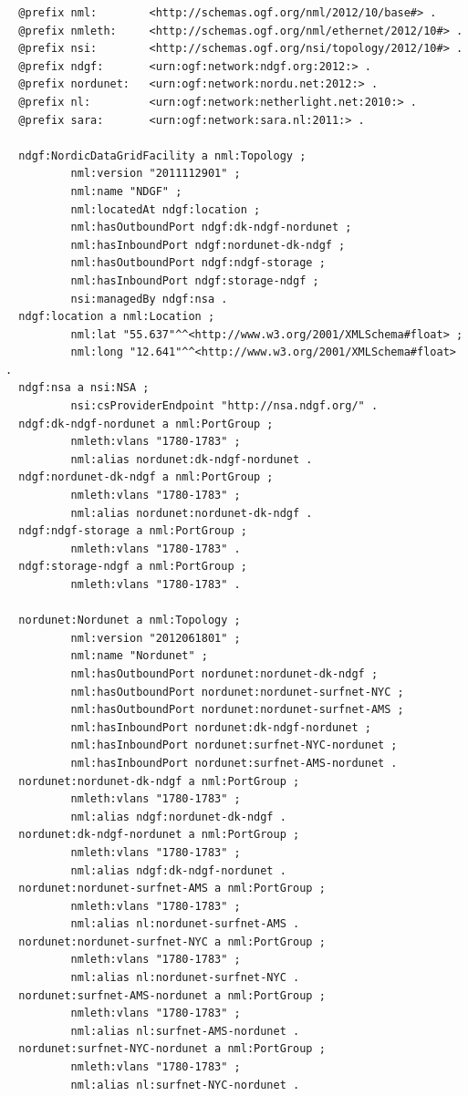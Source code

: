 \documentclass[12pt]{article}  %
\begin{document}
\begin{verbatim}
  @prefix nml:        <http://schemas.ogf.org/nml/2012/10/base#> .
  @prefix nmleth:     <http://schemas.ogf.org/nml/ethernet/2012/10#> .
  @prefix nsi:        <http://schemas.ogf.org/nsi/topology/2012/10#> .
  @prefix ndgf:       <urn:ogf:network:ndgf.org:2012:> .
  @prefix nordunet:   <urn:ogf:network:nordu.net:2012:> .
  @prefix nl:         <urn:ogf:network:netherlight.net:2010:> .
  @prefix sara:       <urn:ogf:network:sara.nl:2011:> .

  ndgf:NordicDataGridFacility a nml:Topology ;
          nml:version "2011112901" ;
          nml:name "NDGF" ;
          nml:locatedAt ndgf:location ;
          nml:hasOutboundPort ndgf:dk-ndgf-nordunet ;
          nml:hasInboundPort ndgf:nordunet-dk-ndgf ;
          nml:hasOutboundPort ndgf:ndgf-storage ;
          nml:hasInboundPort ndgf:storage-ndgf ;
          nsi:managedBy ndgf:nsa .
  ndgf:location a nml:Location ;
          nml:lat "55.637"^^<http://www.w3.org/2001/XMLSchema#float> ;
          nml:long "12.641"^^<http://www.w3.org/2001/XMLSchema#float> .
  ndgf:nsa a nsi:NSA ;
          nsi:csProviderEndpoint "http://nsa.ndgf.org/" .
  ndgf:dk-ndgf-nordunet a nml:PortGroup ;
          nmleth:vlans "1780-1783" ;
          nml:alias nordunet:dk-ndgf-nordunet .
  ndgf:nordunet-dk-ndgf a nml:PortGroup ;
          nmleth:vlans "1780-1783" ;
          nml:alias nordunet:nordunet-dk-ndgf .
  ndgf:ndgf-storage a nml:PortGroup ;
          nmleth:vlans "1780-1783" .
  ndgf:storage-ndgf a nml:PortGroup ;
          nmleth:vlans "1780-1783" .

  nordunet:Nordunet a nml:Topology ;
          nml:version "2012061801" ;
          nml:name "Nordunet" ;
          nml:hasOutboundPort nordunet:nordunet-dk-ndgf ;
          nml:hasOutboundPort nordunet:nordunet-surfnet-NYC ;
          nml:hasOutboundPort nordunet:nordunet-surfnet-AMS ;
          nml:hasInboundPort nordunet:dk-ndgf-nordunet ;
          nml:hasInboundPort nordunet:surfnet-NYC-nordunet ;
          nml:hasInboundPort nordunet:surfnet-AMS-nordunet .
  nordunet:nordunet-dk-ndgf a nml:PortGroup ;
          nmleth:vlans "1780-1783" ;
          nml:alias ndgf:nordunet-dk-ndgf .
  nordunet:dk-ndgf-nordunet a nml:PortGroup ;
          nmleth:vlans "1780-1783" ;
          nml:alias ndgf:dk-ndgf-nordunet .
  nordunet:nordunet-surfnet-AMS a nml:PortGroup ;
          nmleth:vlans "1780-1783" ;
          nml:alias nl:nordunet-surfnet-AMS .
  nordunet:nordunet-surfnet-NYC a nml:PortGroup ;
          nmleth:vlans "1780-1783" ;
          nml:alias nl:nordunet-surfnet-NYC .
  nordunet:surfnet-AMS-nordunet a nml:PortGroup ;
          nmleth:vlans "1780-1783" ;
          nml:alias nl:surfnet-AMS-nordunet .
  nordunet:surfnet-NYC-nordunet a nml:PortGroup ;
          nmleth:vlans "1780-1783" ;
          nml:alias nl:surfnet-NYC-nordunet .


\end{verbatim}
\end{document}
